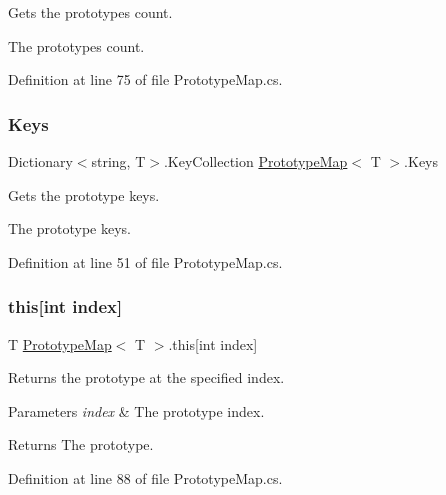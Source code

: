 Gets the prototypes count. 

The prototypes count.

Definition at line 75 of file Prototype\+Map.\+cs.

\mbox{\label{class_prototype_map_a87f4e8a0630815d04ce5a9db05f180ea}} 
\subsubsection{\texorpdfstring{Keys}{Keys}}
{\footnotesize\ttfamily Dictionary$<$string, T$>$.Key\+Collection \hyperlink{class_prototype_map}{Prototype\+Map}$<$ T $>$.Keys\hspace{0.3cm}{\ttfamily [get]}}



Gets the prototype keys. 

The prototype keys.

Definition at line 51 of file Prototype\+Map.\+cs.

\mbox{\label{class_prototype_map_a6ce47f0385f9863fec002085f94c18c8}} 
\subsubsection{\texorpdfstring{this[int index]}{this[int index]}}
{\footnotesize\ttfamily T \hyperlink{class_prototype_map}{Prototype\+Map}$<$ T $>$.this\mbox{[}int index\mbox{]}\hspace{0.3cm}{\ttfamily [get]}}



Returns the prototype at the specified index. 


\begin{DoxyParams}{Parameters}
{\em index} & The prototype index.\\
\hline
\end{DoxyParams}
\begin{DoxyReturn}{Returns}
The prototype.
\end{DoxyReturn}


Definition at line 88 of file Prototype\+Map.\+cs.

\mbox{\label{class_prototype_map_a8a21d043e1ab37240599a85043899959}} 
